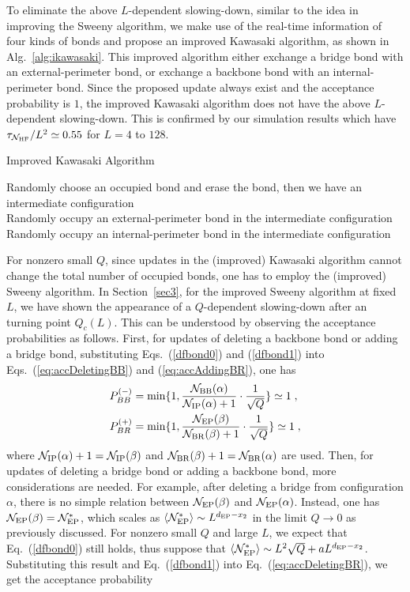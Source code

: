\documentclass[aps,pre,twocolumn,superscriptaddress,longbibliography,floatfix]{revtex4-2}
\begin{document}
To eliminate the above $L$-dependent slowing-down, similar to the idea in improving the Sweeny algorithm, we make use of
the real-time information of four kinds of bonds and propose an improved Kawasaki algorithm, as shown in Alg.~\ref{alg:ikawasaki}. 
This improved algorithm either exchange a bridge bond with an external-perimeter bond,
or exchange a backbone bond with an internal-perimeter bond.
Since the proposed update always exist and the acceptance probability is $1$, the improved Kawasaki algorithm does not
have the above $L$-dependent slowing-down. 
This is confirmed by our simulation results which have {$\tau_{\mathcal{N}_{\rm HF}}/L^2 \simeq 0.55$ for $L = 4$ to $128$.}


\begin{algorithm}[t]
\caption{Improved Kawasaki Algorithm}
\label{alg:ikawasaki}
 Randomly choose an occupied bond and erase the bond, then we have an intermediate configuration\\
{Randomly occupy an external-perimeter bond in the intermediate configuration}
{Randomly occupy an internal-perimeter bond in the intermediate configuration}
\end{algorithm}
\medskip

For nonzero small $Q$, since updates in the (improved) Kawasaki algorithm cannot change the total number of occupied bonds,
one has to employ the (improved) Sweeny algorithm. In Section~\ref{sec3}, for the improved Sweeny algorithm at fixed $L$, we have shown 
the appearance of a $Q$-dependent slowing-down after an turning point $Q_c(L)$. This can be understood by observing 
the acceptance probabilities as follows.
First, for updates of deleting a backbone bond or adding a bridge bond, substituting Eqs.~(\ref{dfbond0}) and (\ref{dfbond1}) into
Eqs.~(\ref{eq:accDeletingBB}) and (\ref{eq:accAddingBR}), one has
\begin{align}
     P^{(-)}_{BB} &=\min \{ 1,\frac{\mathcal{N}_{\rm BB}(\alpha)}{\mathcal{N}_{\rm IP}(\alpha)+1} \cdot \frac{1}{\sqrt{Q}} \} \simeq 1 \;, \\
     P^{(+)}_{BR} &=\min \{ 1,\frac{\mathcal{N}_{\rm EP}(\beta)}{\mathcal{N}_{\rm BR}(\beta)+1} \cdot \frac{1}{\sqrt{Q}} \} \simeq 1 \;,
\end{align}
where $\mathcal{N}_{\rm IP}(\alpha)+1 = \mathcal{N}_{\rm IP}(\beta) $ and $\mathcal{N}_{\rm BR}(\beta)+1 = \mathcal{N}_{\rm BR}(\alpha)$ are used.
Then, for updates of deleting a bridge bond or adding a backbone bond, more considerations are needed.
For example, after deleting a bridge from configuration $\alpha$, there is no simple relation between $\mathcal{N}_{\rm EP}(\beta)$ and $\mathcal{N}_{\rm EP}(\alpha)$.
Instead, one has $\mathcal{N}_{\rm EP}(\beta)=\mathcal{N}^*_{\rm EP}$, which scales as $\langle \mathcal{N}^*_{\rm EP} \rangle \sim L^{d_{\rm EP} - x_2}$ in the limit $Q \rightarrow 0$ as previously discussed.
For nonzero small $Q$ and large $L$, we expect that Eq.~(\ref{dfbond0}) still holds, thus suppose that $\langle \mathcal{N}^{*}_{\rm EP} \rangle \sim L^2\sqrt{Q}+aL^{d_{\rm EP} - x_2}$.
Substituting this result and Eq.~(\ref{dfbond1}) into Eq.~(\ref{eq:accDeletingBR}),  we get the acceptance probability
\end{document}
